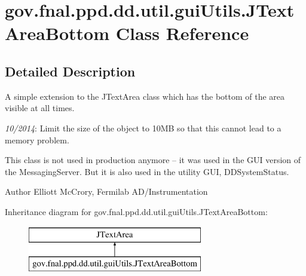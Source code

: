 \hypertarget{classgov_1_1fnal_1_1ppd_1_1dd_1_1util_1_1guiUtils_1_1JTextAreaBottom}{\section{gov.\-fnal.\-ppd.\-dd.\-util.\-gui\-Utils.\-J\-Text\-Area\-Bottom Class Reference}
\label{classgov_1_1fnal_1_1ppd_1_1dd_1_1util_1_1guiUtils_1_1JTextAreaBottom}
}


\subsection{Detailed Description}
A simple extension to the J\-Text\-Area class which has the bottom of the area visible at all times. 

{\itshape 10/2014}\-: Limit the size of the object to 10\-M\-B so that this cannot lead to a memory problem. 

This class is not used in production anymore -- it was used in the G\-U\-I version of the Messaging\-Server. But it is also used in the utility G\-U\-I, D\-D\-System\-Status. 

\begin{DoxyAuthor}{Author}
Elliott Mc\-Crory, Fermilab A\-D/\-Instrumentation 
\end{DoxyAuthor}
Inheritance diagram for gov.\-fnal.\-ppd.\-dd.\-util.\-gui\-Utils.\-J\-Text\-Area\-Bottom\-:\begin{figure}[H]
\begin{center}
\leavevmode
\includegraphics[height=2.000000cm]{classgov_1_1fnal_1_1ppd_1_1dd_1_1util_1_1guiUtils_1_1JTextAreaBottom}
\end{center}
\end{figure}
